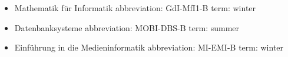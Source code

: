 \begin{itemize}
	\item Mathematik für Informatik
	\subitem abbreviation: GdI-MfI1-B
	\subitem term: winter
	\item Datenbanksysteme
	\subitem abbreviation: MOBI-DBS-B
	\subitem term: summer 
	\item Einführung in die Medieninformatik
	\subitem abbreviation: MI-EMI-B
	\subitem term: winter 
\end{itemize}
